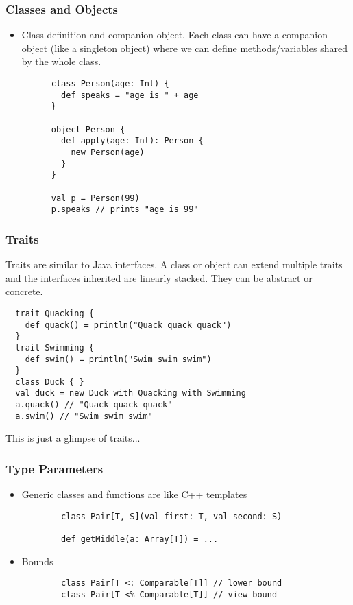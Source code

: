 \documentclass[handout]{beamer}
\begin{document}
\begin{frame}[fragile]
  \frametitle{Classes and Objects}
  \begin{itemize}
    \item Class definition and companion object. Each class can have a companion object (like a singleton object) where we can define methods/variables shared by the whole class.
      \begin{verbatim}
      class Person(age: Int) {
        def speaks = "age is " + age
      }

      object Person {
        def apply(age: Int): Person {
          new Person(age)
        }
      }

      val p = Person(99)
      p.speaks // prints "age is 99"
      \end{verbatim}
  \end{itemize}
\end{frame}

\begin{frame}[fragile]
  \frametitle{Traits}
  Traits are similar to Java interfaces. A class or object can extend multiple traits and the interfaces inherited are linearly stacked. They can be abstract or concrete.
  \begin{verbatim}
  trait Quacking {
    def quack() = println("Quack quack quack")
  }
  trait Swimming {
    def swim() = println("Swim swim swim")
  }
  class Duck { }
  val duck = new Duck with Quacking with Swimming
  a.quack() // "Quack quack quack"
  a.swim() // "Swim swim swim"
  \end{verbatim}
  This is just a glimpse of traits...
\end{frame}

\begin{frame}[fragile]
  \frametitle{Type Parameters}
  \begin{itemize}
      \item Generic classes and functions are like C++ templates
        \begin{verbatim}
        class Pair[T, S](val first: T, val second: S)

        def getMiddle(a: Array[T]) = ...
        \end{verbatim}
      \item Bounds
        \begin{verbatim}
        class Pair[T <: Comparable[T]] // lower bound
        class Pair[T <% Comparable[T]] // view bound
        \end{verbatim}
  \end{itemize}
\end{frame}
\end{document}
